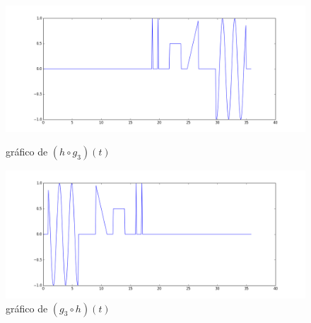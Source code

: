 \documentclass[12pt]{article}
\begin{document}
\begin{figure}[!h]
	\centering
	\begin{minipage}[b]{0.49\linewidth}
		\includegraphics[width=1.15\linewidth]{hog3.png}
		\caption{gráfico de $(h\circ g_3)(t)$}
	\end{minipage}
	\hfill
	\begin{minipage}[b]{0.49\linewidth}
		\includegraphics[width=1.15\linewidth]{g3oh.png}
		\caption{gráfico de $(g_3\circ h)(t)$}
	\end{minipage}
\end{figure}
\end{document}

